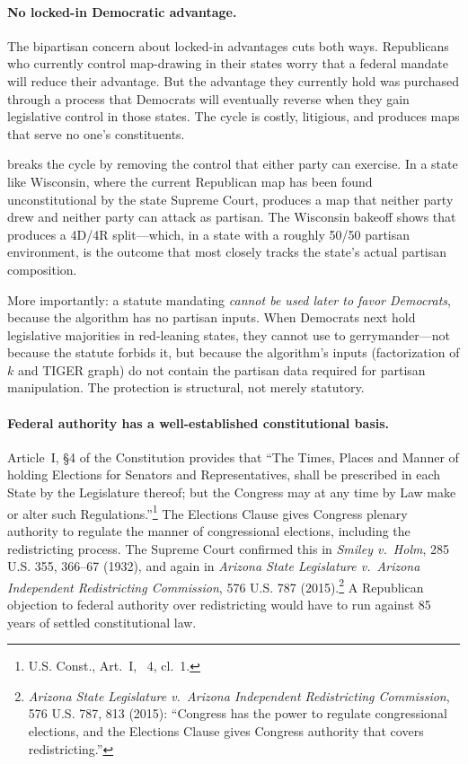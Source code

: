 \paragraph{No locked-in Democratic advantage.}
The bipartisan concern about locked-in advantages cuts both ways.
Republicans who currently control map-drawing in their states worry that
a federal mandate will reduce their advantage.
But the advantage they currently hold was purchased through a process that
Democrats will eventually reverse when they gain legislative control in those
states.
The cycle is costly, litigious, and produces maps that serve no one's
constituents.

\ar{} breaks the cycle by removing the control that either party can exercise.
In a state like Wisconsin, where the current Republican map has been found
unconstitutional by the state Supreme Court, \ar{} produces a map that
neither party drew and neither party can attack as partisan.
The Wisconsin bakeoff shows that \ar{} produces a 4D/4R split---which, in a
state with a roughly 50/50 partisan environment, is the outcome that most
closely tracks the state's actual partisan composition.

More importantly: a statute mandating \ar{} \emph{cannot be used later to
favor Democrats}, because the algorithm has no partisan inputs.
When Democrats next hold legislative majorities in red-leaning states, they
cannot use \ar{} to gerrymander---not because the statute forbids it, but
because the algorithm's inputs (factorization of $k$ and TIGER graph) do not
contain the partisan data required for partisan manipulation.
The protection is structural, not merely statutory.

\paragraph{Federal authority has a well-established constitutional basis.}
Article~I, \S4 of the Constitution provides that ``The Times, Places and
Manner of holding Elections for Senators and Representatives, shall be
prescribed in each State by the Legislature thereof; but the Congress may
at any time by Law make or alter such Regulations.''\footnote{%
  U.S. Const., Art.\ I, \usca{}~4, cl.\ 1.
}
The Elections Clause gives Congress plenary authority to regulate the
manner of congressional elections, including the redistricting process.
The Supreme Court confirmed this in \textit{Smiley v.\ Holm},
285 U.S. 355, 366--67 (1932), and again in \textit{Arizona State
Legislature v.\ Arizona Independent Redistricting Commission},
576 U.S. 787 (2015).\footnote{%
  \textit{Arizona State Legislature v.\ Arizona Independent Redistricting
  Commission}, 576 U.S. 787, 813 (2015): ``Congress has the power to
  regulate congressional elections, and the Elections Clause gives Congress
  authority that covers redistricting.''
}
A Republican objection to federal authority over redistricting would have
to run against 85 years of settled constitutional law.

